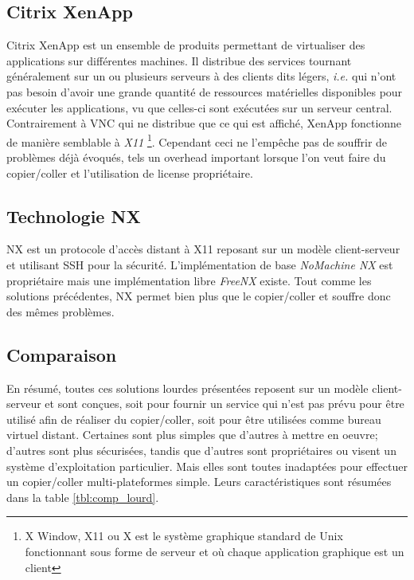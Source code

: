 \subsection{Citrix XenApp}
Citrix XenApp \cite{wiki:xenapp} est un ensemble de produits permettant de
virtualiser des applications sur différentes machines. Il distribue
des services tournant généralement sur un ou plusieurs serveurs à des
clients dits légers, \emph{i.e.} qui n'ont pas besoin d'avoir une grande
quantité de ressources matérielles disponibles pour exécuter
les applications, vu que celles-ci sont exécutées sur un serveur central.
Contrairement à VNC qui ne distribue que ce qui est
affiché, XenApp fonctionne de manière semblable à \emph{X11}
\footnote{X Window, X11 ou X est le système
graphique standard de Unix fonctionnant sous forme de serveur et où
chaque application graphique est un client}. Cependant ceci ne l'empêche
pas de souffrir de problèmes déjà évoqués, tels un overhead important lorsque
l'on veut faire du copier/coller et l'utilisation de license propriétaire.

\subsection{Technologie NX}
NX \cite{wiki:nx} est un protocole d'accès distant à X11 reposant sur un
modèle client-serveur et utilisant SSH pour la sécurité. L'implémentation
de base \emph{NoMachine NX} est propriétaire mais une implémentation libre
\emph{FreeNX} \cite{freenx} existe. Tout comme les solutions précédentes, NX
permet bien plus que le copier/coller et souffre donc des mêmes problèmes.

\subsection{Comparaison}
En résumé, toutes ces solutions lourdes présentées reposent
sur un modèle client-serveur et sont conçues, soit pour fournir un service
qui n'est pas prévu pour être utilisé afin de réaliser du copier/coller,
soit pour être utilisées comme bureau virtuel distant. Certaines sont
plus simples que d'autres à mettre en oeuvre; d'autres sont plus sécurisées,
tandis que d'autres sont propriétaires ou visent un système d'exploitation
particulier. Mais elles sont toutes inadaptées pour effectuer
un copier/coller multi-plateformes simple. Leurs caractéristiques sont résumées
dans la table \ref{tbl:comp_lourd}.

